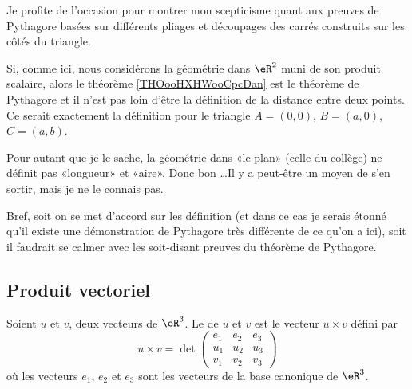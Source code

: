 \begin{normaltext}
	Je profite de l'occasion pour montrer mon scepticisme quant aux preuves de Pythagore basées sur différents pliages et découpages des carrés construits sur les côtés du triangle.

	Si, comme ici, nous considérons la géométrie dans \( \eR^2\) muni de son produit scalaire, alors le théorème \ref{THOooHXHWooCpcDan} est le théorème de Pythagore et il n'est pas loin d'être la définition de la distance entre deux points. Ce serait exactement la définition pour le triangle \( A=(0,0)\), \( B=(a,0)\), \( C=(a,b)\).

	Pour autant que je le sache, la géométrie dans «le plan» (celle du collège) ne définit pas «longueur» et «aire». Donc bon \ldots Il y a peut-être un moyen de s'en sortir, mais je ne le connais pas.

	Bref, soit on se met d'accord sur les définition (et dans ce cas je serais étonné qu'il existe une démonstration de Pythagore très différente de ce qu'on a ici), soit il faudrait se calmer avec les soit-disant preuves du théorème de Pythagore.
\end{normaltext}

\subsection{Produit vectoriel}

\begin{definition}      \label{DEFooTNTNooRjhuJZ}
	Soient \( u\) et \( v\), deux vecteurs de \( \eR^3\). Le  de \( u\) et \( v\) est le vecteur \( u\times v\) défini par
	\begin{equation}    \label{EQooCUJRooFuFPaZ}
		u\times v=\det\begin{pmatrix}
			e_1 & e_2 & e_3 \\
			u_1 & u_2 & u_3 \\
			v_1 & v_2 & v_3
		\end{pmatrix}
	\end{equation}
	où les vecteurs \( e_1\), \( e_2\) et \( e_3\) sont les vecteurs de la base canonique de \( \eR^3\).
\end{definition}


